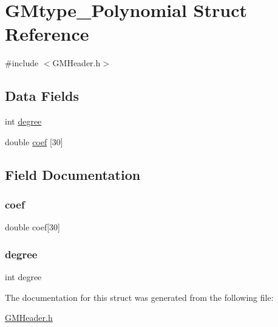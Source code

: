 \hypertarget{struct_g_mtype___polynomial}{}\section{G\+Mtype\+\_\+\+Polynomial Struct Reference}
\label{struct_g_mtype___polynomial}


{\ttfamily \#include $<$G\+M\+Header.\+h$>$}

\subsection*{Data Fields}
\begin{DoxyCompactItemize}
\item 
int \mbox{\hyperlink{struct_g_mtype___polynomial_a3ad2418bacc6ee3c0ff8cc6ed2832ec9}{degree}}
\item 
double \mbox{\hyperlink{struct_g_mtype___polynomial_a74f9887b0a3d50d4c985fffe39b11ad5}{coef}} \mbox{[}30\mbox{]}
\end{DoxyCompactItemize}


\subsection{Field Documentation}
\mbox{\label{struct_g_mtype___polynomial_a74f9887b0a3d50d4c985fffe39b11ad5}} 
\subsubsection{\texorpdfstring{coef}{coef}}
{\footnotesize\ttfamily double coef\mbox{[}30\mbox{]}}

\mbox{\label{struct_g_mtype___polynomial_a3ad2418bacc6ee3c0ff8cc6ed2832ec9}} 
\subsubsection{\texorpdfstring{degree}{degree}}
{\footnotesize\ttfamily int degree}



The documentation for this struct was generated from the following file\+:\begin{DoxyCompactItemize}
\item 
\mbox{\hyperlink{_g_m_header_8h}{G\+M\+Header.\+h}}\end{DoxyCompactItemize}
